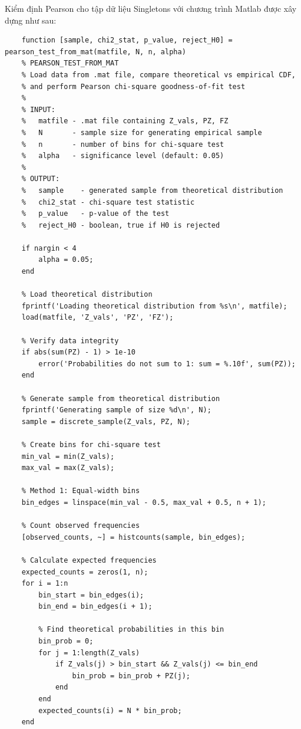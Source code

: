 Kiểm định Pearson cho tập dữ liệu Singletons với chương trình Matlab được xây dựng như sau:

\begin{matlab}
    \begin{lstlisting}
    function [sample, chi2_stat, p_value, reject_H0] = pearson_test_from_mat(matfile, N, n, alpha)
    % PEARSON_TEST_FROM_MAT
    % Load data from .mat file, compare theoretical vs empirical CDF,
    % and perform Pearson chi-square goodness-of-fit test
    %
    % INPUT:
    %   matfile - .mat file containing Z_vals, PZ, FZ
    %   N       - sample size for generating empirical sample
    %   n       - number of bins for chi-square test
    %   alpha   - significance level (default: 0.05)
    %
    % OUTPUT:
    %   sample    - generated sample from theoretical distribution
    %   chi2_stat - chi-square test statistic
    %   p_value   - p-value of the test
    %   reject_H0 - boolean, true if H0 is rejected

    if nargin < 4
        alpha = 0.05;
    end

    % Load theoretical distribution
    fprintf('Loading theoretical distribution from %s\n', matfile);
    load(matfile, 'Z_vals', 'PZ', 'FZ');
    
    % Verify data integrity
    if abs(sum(PZ) - 1) > 1e-10
        error('Probabilities do not sum to 1: sum = %.10f', sum(PZ));
    end
    
    % Generate sample from theoretical distribution
    fprintf('Generating sample of size %d\n', N);
    sample = discrete_sample(Z_vals, PZ, N);
    
    % Create bins for chi-square test
    min_val = min(Z_vals);
    max_val = max(Z_vals);
    
    % Method 1: Equal-width bins
    bin_edges = linspace(min_val - 0.5, max_val + 0.5, n + 1);
    
    % Count observed frequencies
    [observed_counts, ~] = histcounts(sample, bin_edges);
    
    % Calculate expected frequencies
    expected_counts = zeros(1, n);
    for i = 1:n
        bin_start = bin_edges(i);
        bin_end = bin_edges(i + 1);
        
        % Find theoretical probabilities in this bin
        bin_prob = 0;
        for j = 1:length(Z_vals)
            if Z_vals(j) > bin_start && Z_vals(j) <= bin_end
                bin_prob = bin_prob + PZ(j);
            end
        end
        expected_counts(i) = N * bin_prob;
    end
    

\end{lstlisting}
\end{matlab}
